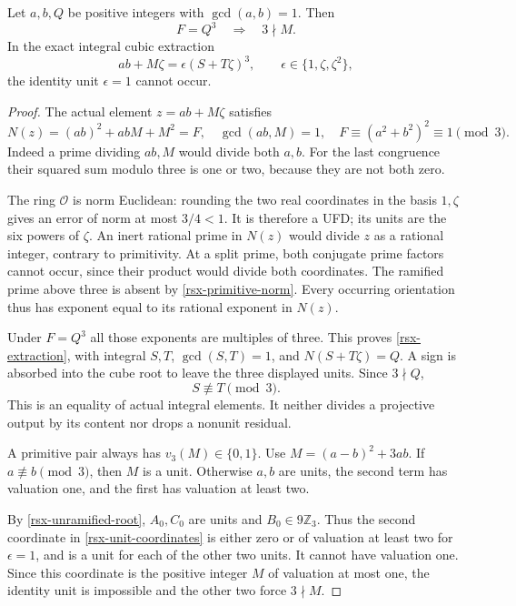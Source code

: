\begin{theorem}
\label{rsx-integer-gate}
Let \(a,b,Q\) be positive integers with \(\gcd(a,b)=1\).
Then
\begin{equation}
 F=Q^3\quad\Longrightarrow\quad3\nmid M.
 \label{rsx-main-implication}
\end{equation}
In the exact integral cubic extraction
\begin{equation}
 ab+M\zeta=\epsilon(S+T\zeta)^3,\qquad
 \epsilon\in\{1,\zeta,\zeta^2\},
 \label{rsx-extraction}
\end{equation}
the identity unit \(\epsilon=1\) cannot occur.
\end{theorem}
\begin{proof}
The actual element \(z=ab+M\zeta\) satisfies
\begin{equation}
 N(z)=(ab)^2+abM+M^2=F,\quad
 \gcd(ab,M)=1,\quad F\equiv(a^2+b^2)^2\equiv1\pmod3.
 \label{rsx-primitive-norm}
\end{equation}
Indeed a prime dividing \(ab,M\) would divide both \(a,b\).
For the last congruence their squared sum modulo three is
one or two, because they are not both zero.

The ring \(\mathcal O\) is norm Euclidean: rounding the two
real coordinates in the basis \(1,\zeta\) gives an error
of norm at most \(3/4<1\). It is therefore a UFD; its units
are the six powers of \(\zeta\). An inert rational prime in
\(N(z)\) would divide \(z\) as a rational integer, contrary
to primitivity. At a split prime, both conjugate prime
factors cannot occur, since their product would divide both
coordinates. The ramified prime above three is absent by
\eqref{rsx-primitive-norm}. Every occurring orientation
thus has exponent equal to its rational exponent in \(N(z)\).

Under \(F=Q^3\) all those exponents are multiples of three.
This proves \eqref{rsx-extraction}, with integral \(S,T\),
\(\gcd(S,T)=1\), and \(N(S+T\zeta)=Q\). A sign is absorbed
into the cube root to leave the three displayed units.
Since \(3\nmid Q\),
\begin{equation}
 S\not\equiv T\pmod3 .
 \label{rsx-unramified-root}
\end{equation}
This is an equality of actual integral elements. It neither
divides a projective output by its content nor drops a
nonunit residual.

A primitive pair always has \(v_3(M)\in\{0,1\}\).
Use \(M=(a-b)^2+3ab\). If \(a\not\equiv b\pmod3\),
then \(M\) is a unit. Otherwise \(a,b\) are units, the
second term has valuation one, and the first has valuation
at least two.

By \eqref{rsx-unramified-root}, \(A_0,C_0\) are units
and \(B_0\in9\mathbb Z_3\). Thus the second coordinate in
\eqref{rsx-unit-coordinates} is either zero or of valuation
at least two for \(\epsilon=1\), and is a unit for each of
the other two units. It cannot have valuation one.
Since this coordinate is the positive integer \(M\)
of valuation at most one, the identity unit is impossible
and the other two force \(3\nmid M\).
\end{proof}

